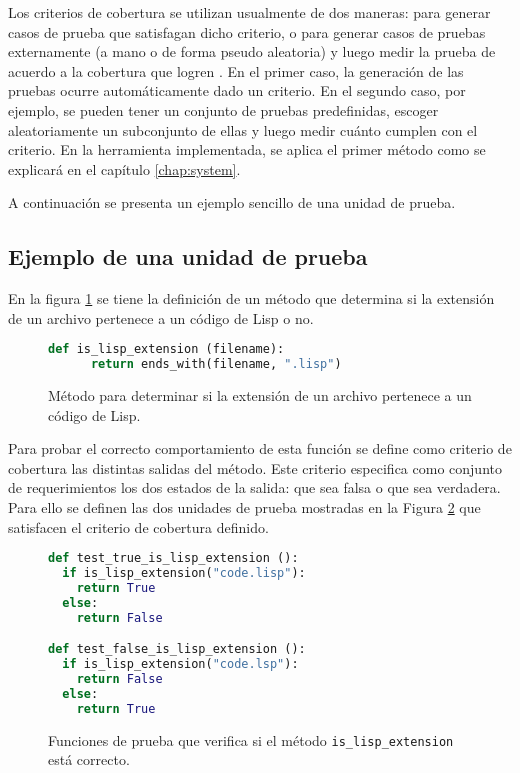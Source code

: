 Los criterios de cobertura se utilizan usualmente de dos maneras: para generar casos de prueba que satisfagan dicho criterio, o para generar casos de pruebas externamente (a mano o de forma pseudo aleatoria) y luego medir la prueba de acuerdo a la cobertura que logren \cite{ammann@introSoftTest}. En el primer caso, la generación de las pruebas ocurre automáticamente dado un criterio. En el segundo caso, por ejemplo, se pueden tener un conjunto de pruebas predefinidas, escoger aleatoriamente un subconjunto de ellas y luego medir cuánto cumplen con el criterio. En la herramienta implementada, se aplica el primer método como se explicará en el capítulo \ref{chap:system}.

A continuación se presenta un ejemplo sencillo de una unidad de prueba.

\subsection{Ejemplo de una unidad de prueba}
En la figura \ref{alg:func} se tiene la definición de un método que determina si la extensión de un archivo pertenece a un código de Lisp o no.

\begin{figure}[h!]
  \begin{lstlisting}[language=Python]
    def is_lisp_extension (filename):
	  return ends_with(filename, ".lisp")
  \end{lstlisting}
  \caption{Método para determinar si la extensión de un archivo pertenece a un código de Lisp.}  \label{alg:func}
\end{figure}

Para probar el correcto comportamiento de esta función se define como criterio de cobertura las distintas salidas del método. Este criterio especifica como conjunto de requerimientos los dos estados de la salida: que sea falsa o que sea verdadera. Para ello se definen las dos unidades de prueba mostradas en la Figura \ref{alg:test} que satisfacen el criterio de cobertura definido.

\begin{figure}[h!]
\begin{lstlisting}[language=Python]
def test_true_is_lisp_extension ():
  if is_lisp_extension("code.lisp"):
    return True
  else:
    return False

def test_false_is_lisp_extension ():
  if is_lisp_extension("code.lsp"):
    return False
  else:
    return True
\end{lstlisting}
\caption{Funciones de prueba que verifica si el método {\tt is\_lisp\_extension} está correcto.} \label{alg:test}
\end{figure}

